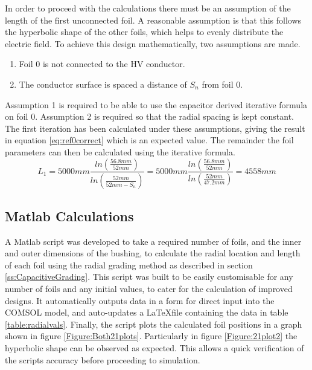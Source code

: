 In order to proceed with the calculations there must be an assumption of the length of the first unconnected foil.
A reasonable assumption is that this follows the hyperbolic shape of the other foils, which helps to evenly distribute the electric field.
To achieve this design mathematically, two assumptions are made.
\begin{enumerate}
\item Foil 0 is not connected to the HV conductor.
\item The conductor surface is spaced a distance of $S_n$ from foil 0.
\end{enumerate}
Assumption 1 is required to be able to use the capacitor derived iterative formula on foil 0.
Assumption 2 is required so that the radial spacing is kept constant.
The first iteration has been calculated under these assumptions, giving the result in equation \ref{eq:ref0correct} which is an expected value.
The remainder the foil parameters can then be calculated using the iterative formula.
\begin{equation}
   \label{eq:ref0correct}
   L_{1} = 5000mm\frac{{ln(\frac{56.8mm}{52mm})} }{ln(\frac{52mm}{52mm - S_n})}
   = 5000mm\frac{{ln(\frac{56.8mm}{52mm})} }{ln(\frac{52mm}{47.2mm})}
   = 4558mm
\end{equation}

\subsection{Matlab Calculations}
A Matlab script was developed to take a required number of foils, and the inner and outer dimensions of the bushing, to calculate the radial location and length of each foil using the radial grading method as described in section \ref{ss:CapacitiveGrading}.
This script was built to be easily customisable for any number of foils and any initial values, to cater for the calculation of improved designs.
It automatically outputs data in a form for direct input into the COMSOL model, and auto-updates a \LaTeX  file containing the data in table \ref{table:radialvals}.
Finally, the script plots the calculated foil positions in a graph shown in figure \ref{Figure:Both21plots}.
Particularly in figure \ref{Figure:21plot2} the hyperbolic shape can be observed as expected.
This allows a quick verification of the scripts accuracy before proceeding to simulation.



